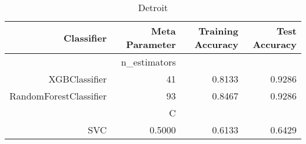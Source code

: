 
\begin{table}[H]
    \caption{Detroit}
    \centering
    \begin{tabular}{|r|r|r|r|}
        \hline
        Classifier &Meta Parameter &Training Accuracy
        &Test Accuracy\\
        \hline
        &n\_estimators &\multicolumn{2}{|r|}{}\\
        \hline
        XGBClassifier &41 &0.8133 &0.9286\\
        \hline
        RandomForestClassifier &93 &0.8467 &0.9286\\
        \hline
        &C &\multicolumn{2}{|r|}{}\\
        \hline
        SVC &0.5000 &0.6133 &0.6429\\
        \hline
    \end{tabular}
\end{table}
